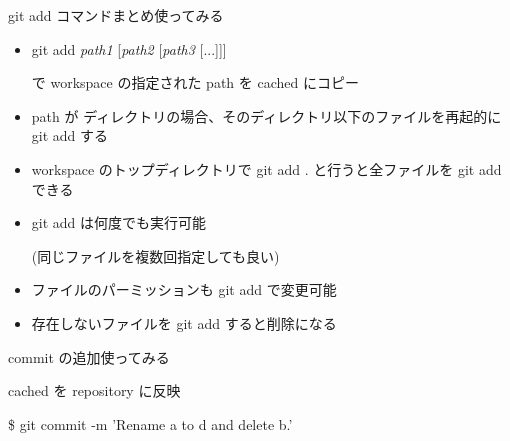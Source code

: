 \begin{frame}[t]{git add コマンドまとめ}{使ってみる}

  \begin{itemize}
  \item git add \textit{path1} [\textit{path2} [\textit{path3} [...]]]

    で workspace の指定された path を cached にコピー
    \vspace{2ex}

  \item path が ディレクトリの場合、そのディレクトリ以下のファイルを再起的に git add する
    \vspace{2ex}

  \item workspace のトップディレクトリで git add . と行うと全ファイルを git add できる
  \item git add は何度でも実行可能

    (同じファイルを複数回指定しても良い)
  \item ファイルのパーミッションも git add で変更可能
  \item 存在しないファイルを git add すると削除になる
  \end{itemize}

\end{frame}


\begin{frame}[t]{commit の追加}{使ってみる}

  cached を repository に反映
  \vspace{2ex}

  \$ git commit -m 'Rename a to d and delete b.'
\end{frame}


